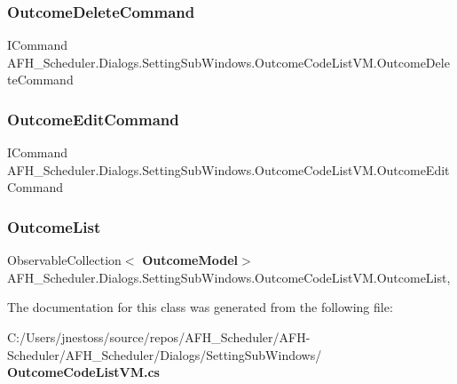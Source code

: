 \subsubsection{OutcomeDeleteCommand}
{\footnotesize\ttfamily I\+Command A\+F\+H\+\_\+\+Scheduler.\+Dialogs.\+Setting\+Sub\+Windows.\+Outcome\+Code\+List\+V\+M.\+Outcome\+Delete\+Command\hspace{0.3cm}{\ttfamily [get]}}

\mbox{\label{class_a_f_h___scheduler_1_1_dialogs_1_1_setting_sub_windows_1_1_outcome_code_list_v_m_a4c7240e6c01424c0b87dc078ec507491}} 
\subsubsection{OutcomeEditCommand}
{\footnotesize\ttfamily I\+Command A\+F\+H\+\_\+\+Scheduler.\+Dialogs.\+Setting\+Sub\+Windows.\+Outcome\+Code\+List\+V\+M.\+Outcome\+Edit\+Command\hspace{0.3cm}{\ttfamily [get]}}

\mbox{\label{class_a_f_h___scheduler_1_1_dialogs_1_1_setting_sub_windows_1_1_outcome_code_list_v_m_aae1245cea2c59c345fcd6ec2c5317c36}} 
\subsubsection{OutcomeList}
{\footnotesize\ttfamily Observable\+Collection$<$\textbf{ Outcome\+Model}$>$ A\+F\+H\+\_\+\+Scheduler.\+Dialogs.\+Setting\+Sub\+Windows.\+Outcome\+Code\+List\+V\+M.\+Outcome\+List\hspace{0.3cm}{\ttfamily [get]}, {\ttfamily [set]}}



The documentation for this class was generated from the following file\+:\begin{DoxyCompactItemize}
\item 
C\+:/\+Users/jnestoss/source/repos/\+A\+F\+H\+\_\+\+Scheduler/\+A\+F\+H-\/\+Scheduler/\+A\+F\+H\+\_\+\+Scheduler/\+Dialogs/\+Setting\+Sub\+Windows/\textbf{ Outcome\+Code\+List\+V\+M.\+cs}\end{DoxyCompactItemize}
